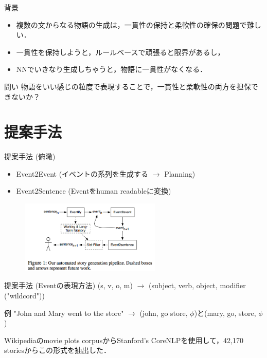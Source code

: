 \documentclass[dvipdfmx, 12pt]{beamer}
\begin{document}
\begin{frame}{背景}
  \begin{itemize}
    \item 複数の文からなる物語の生成は，一貫性の保持と柔軟性の確保の問題で難しい．
    \item 一貫性を保持しようと，ルールベースで頑張ると限界があるし，
    \item NNでいきなり生成しちゃうと，物語に一貫性がなくなる．
  \end{itemize}
  \begin{block}{問い}
    物語をいい感じの粒度で表現することで，一貫性と柔軟性の両方を担保できないか？
  \end{block}
\end{frame}


\section{提案手法}
\begin{frame}{提案手法 (俯瞰)}
  \begin{itemize}
    \item Event2Event (イベントの系列を生成する $\rightarrow$ Planning)
    \item Event2Sentence (Eventをhuman readableに変換)
  \end{itemize}
  \begin{figure}
    \includegraphics[width=0.6\textwidth]{imgs/framework.png}
  \end{figure}
\end{frame}

\begin{frame}{提案手法 (Eventの表現方法)}
    (s, v, o, m) $\rightarrow$ (subject, verb, object, modifier ("wildcord"))
  \begin{exampleblock}{例}
    "John and Mary went to the store" $\rightarrow$ (john, go store, $\phi$)と(mary, go, store, $\phi$)
  \end{exampleblock}
  Wikipediaのmovie plots corpusからStanford's CoreNLPを使用して，42,170 storiesからこの形式を抽出した．
\end{frame}
\end{document}
